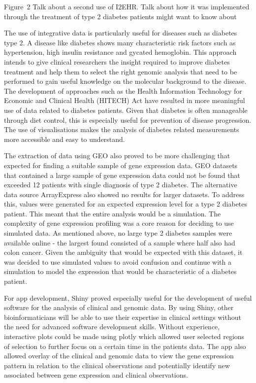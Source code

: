 \documentclass{bioinfo}
\begin{document}
\begin{Discussion}
Figure~2\vphantom{\ref{fig:02}} Talk about a second use of I2EHR. Talk about how it was implemented through the treatment of type 2 diabetes patients \citealp{Boffelli03} might want to know about 

The use of integrative data is particularly useful for diseases such as diabetes type 2. A disease like diabetes shows many characteristic risk factors such as hypertension, high insulin resistance and gycated hemoglobin. This approach intends to give clinical researchers the insight required to improve diabetes treatment and help them to select the right genomic analysis that need to be performed to gain useful knowledge on the molecular background to the disease. The development of approaches such as the Health Information Technology for Economic and Clinical Health (HITECH) Act have resulted in more meaningful use of data related to diabetes patients. Given that diabetes is often manageable through diet control, this is especially useful for prevention of disease progression. The use of visualisations makes the analysis of diabetes related measurements more accessible and easy to understand. 

The extraction of data using GEO also proved to be more challenging that expected for finding a suitable sample of gene expression data. GEO datasets that contained a large sample of gene expression data could not be found that exceeded 12 patients with single diagnosis of type 2 diabetes. The alternative data source ArrayExpress also showed no results for larger datasets. To address this, values were generated for an expected expression level for a type 2 diabetes patient. This meant that the entire analysis would be a simulation. The complexity of gene expression profiling was a core reason for deciding to use simulated data. As mentioned above, no large type 2 diabetes samples were available online - the largest found consisted of a sample where half also had colon cancer. Given the ambiguity that would be expected with this dataset, it was decided to use simulated values to avoid confusion and continue with a simulation to model the expression that would be characteristic of a diabetes patient.  

For app development, Shiny proved especially useful for the development of useful software for the analysis of clinical and genomic data. By using Shiny, other bioinformaticians will be able to use their expertise in clinical settings without the need for advanced software development skills. Without experience, interactive plots could be made using plotly which allowed user selected regions of selection to further focus on a certain time in the patients data. The app also allowed overlay of the clinical and genomic data to view the gene expression pattern in relation to the clinical observations and potentially identify new associated between gene expression and clinical observations. 


\end{Discussion}
\end{document}
